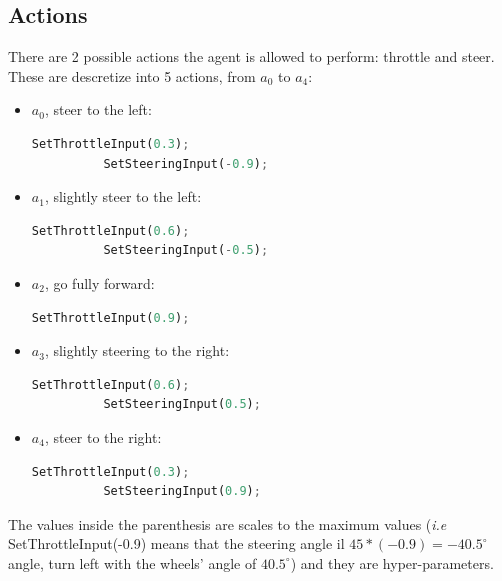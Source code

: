 \documentclass[14pt]{extarticle}
\def\sp{\vspace{5pt}}
\begin{document}
\begin{flushleft}
	\subsection{Actions}
	\sp
	There are 2 possible actions the agent is allowed to perform: throttle and steer. These are descretize into 5 actions, from $a_0$ to $a_4$:
	\begin{itemize}
	\item $a_0$, steer to the left:
		\begin{lstlisting}[mathescape=true, language=Python]
		  SetThrottleInput(0.3);
		  SetSteeringInput(-0.9); \end{lstlisting}
	\item $a_1$, slightly steer to the left:
		\begin{lstlisting}[mathescape=true, language=Python]
		  SetThrottleInput(0.6);
		  SetSteeringInput(-0.5); \end{lstlisting}
	\item $a_2$, go fully forward:
		\begin{lstlisting}[mathescape=true, language=Python]
		  SetThrottleInput(0.9); \end{lstlisting}
	\item $a_3$, slightly steering to the right:
		\begin{lstlisting}[mathescape=true, language=Python]
		  SetThrottleInput(0.6);
		  SetSteeringInput(0.5); \end{lstlisting}
	\item $a_4$, steer to the right:
		\begin{lstlisting}[mathescape=true, language=Python]
		  SetThrottleInput(0.3);
		  SetSteeringInput(0.9); \end{lstlisting}
	\end{itemize}
	The values inside the parenthesis are scales to the maximum values (\emph{i.e} SetThrottleInput(-0.9) means that the steering angle il $45*(-0.9)=-40.5^{\circ}$ angle, turn left with the wheels' angle of $40.5^{\circ}$) and they are hyper-parameters.

	

\end{flushleft}
\end{document}

